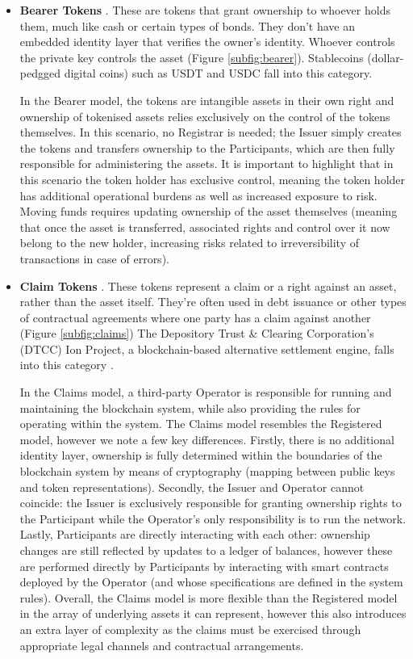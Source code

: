 \begin{itemize}
    \item \textbf{Bearer Tokens} \citep{bearer_tokens}. These are tokens that grant ownership to whoever holds them, much like cash or certain types of bonds. They don't have an embedded identity layer that verifies the owner's identity. Whoever controls the private key controls the asset (Figure \ref{subfig:bearer}). Stablecoins (dollar-pedgged digital coins) such as USDT \citep{usdt} and USDC \citep{usdc} fall into this category.

    In the Bearer model, the tokens are intangible assets in their own right and ownership of tokenised assets relies exclusively on the control of the tokens themselves. In this scenario, no Registrar is needed; the Issuer simply creates the tokens and transfers ownership to the Participants, which are then fully responsible for administering the assets. It is important to highlight that in this scenario the token holder has exclusive control, meaning the token holder has additional operational burdens as well as increased exposure to risk. Moving funds requires updating ownership of the asset themselves (meaning that once the asset is transferred, associated rights and control over it now belong to the new holder, increasing risks related to irreversibility of transactions in case of errors).

    \item \textbf{Claim Tokens} \citep{claims_tokens}. These tokens represent a claim or a right against an asset, rather than the asset itself. They're often used in debt issuance or other types of contractual agreements where one party has a claim against another (Figure \ref{subfig:claims}) The Depository Trust \& Clearing Corporation's (DTCC) Ion Project, a blockchain-based alternative settlement engine, falls into this category \citep{project_ion}.

    In the Claims model, a third-party Operator is responsible for running and maintaining the blockchain system, while also providing the rules for operating within the system. The Claims model resembles the Registered model, however we note a few key differences. Firstly, there is no additional identity layer, ownership is fully determined within the boundaries of the blockchain system by means of cryptography (mapping between public keys and token representations). Secondly, the Issuer and Operator cannot coincide: the Issuer is exclusively responsible for granting ownership rights to the Participant while the Operator's only responsibility is to run the network. Lastly, Participants are directly interacting with each other: ownership changes are still reflected by updates to a ledger of balances, however these are performed directly by Participants by interacting with smart contracts deployed by the Operator (and whose specifications are defined in the system rules). Overall, the Claims model is more flexible than the Registered model in the array of underlying assets it can represent, however this also introduces an extra layer of complexity as the claims must be exercised through appropriate legal channels and contractual arrangements.
    
\end{itemize}


